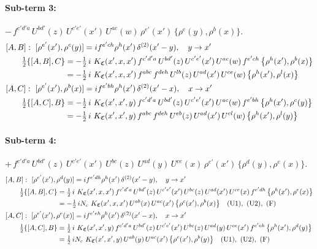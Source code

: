 \documentclass[10pt]{article}
\numberwithin{equation}{section}
\begin{document}
\paragraph{Sub-term 3:} $-\,f^{c'd'a}\,U^{bd'}(z)\,U^{c'e'}(x')\,U^{ac}(w)\,\rho^{e'}(x')\,\big\{\rho^{c}(y),\rho^{b}(x)\big\}$.
\begin{align}
&[A,B]:\ [\rho^{e'}(x'),\rho^{c}(y)]=i f^{e'ch}\rho^{h}(x')\,\delta^{(2)}(x'-y),\quad y\to x'\notag\\
&\qquad \tfrac12\{[A,B],C\}=-\tfrac12\,i\,\,K_{\mathfrak C}(x',x,x')\,f^{c'd'a}\,U^{bd'}(z)\,U^{c'e'}(x')\,U^{ac}(w)\,f^{e'ch}\,\big\{\rho^{h}(x'),\rho^{b}(x)\big\}\notag\\
&\qquad\phantom{\tfrac12\{[A,B],C\}}=-\tfrac12\,i\,\,K_{\mathfrak C}(x',x,x')\,f^{abc}\,f^{deh}\,U^{lb}(z)\,U^{ad}(x')\,U^{ce}(w)\,\big\{\rho^{h}(x'),\rho^{l}(x)\big\}
\label{eq:GIII.III-3-AB}\\
&[A,C]:\ [\rho^{e'}(x'),\rho^{b}(x)]=i f^{e'bh}\rho^{h}(x')\,\delta^{(2)}(x'-x),\quad x\to x'\notag\\
&\qquad \tfrac12\{[A,C],B\}=-\tfrac12\,i\,\,K_{\mathfrak C}(x',x',y)\,f^{c'd'a}\,U^{bd'}(z)\,U^{c'e'}(x')\,U^{ac}(w)\,f^{e'bh}\,\big\{\rho^{h}(x'),\rho^{c}(y)\big\}\notag\\
&\qquad\phantom{\tfrac12\{[A,C],B\}}=-\tfrac12\,i\,\,K_{\mathfrak C}(x',x',y)\,f^{abc}\,f^{deh}\,U^{eb}(z)\,U^{ad}(x')\,U^{cl}(w)\,\big\{\rho^{h}(x'),\rho^{l}(y)\big\}
\label{eq:GIII.III-3-AC}
\end{align}
\paragraph{Sub-term 4:} $+\,f^{c'd'a}\,U^{bd'}(z)\,U^{c'e'}(x')\,U^{bc}(z)\,U^{ad}(y)\,U^{ce}(x)\,\rho^{e'}(x')\,\big\{\rho^{d}(y),\rho^{e}(x)\big\}$.
\begin{align}
&[A,B]:\ [\rho^{e'}(x'),\rho^{d}(y)]=i f^{e'dh}\rho^{h}(x')\,\delta^{(2)}(x'-y),\quad y\to x'\notag\\
&\qquad \tfrac12\{[A,B],C\}=\tfrac12\,i\,\,K_{\mathfrak C}(x',x,x')\,f^{c'd'a}\,U^{bd'}(z)\,U^{c'e'}(x')\,U^{bc}(z)\,U^{ad}(x')\,U^{ce}(x)\,f^{e'dh}\,\big\{\rho^{h}(x'),\rho^{e}(x)\big\}\notag\\
&\qquad\phantom{\tfrac12\{[A,B],C\}}=-\tfrac12\,i N_{c}\,\,K_{\mathfrak C}(x',x,x')\,U^{ab}(x)\,U^{ac}(x')\,\big\{\rho^{c}(x'),\rho^{b}(x)\big\}\quad\text{(U1)},\ \text{(U2)},\ \text{(F)}
\label{eq:GIII.III-4-AB}\\
&[A,C]:\ [\rho^{e'}(x'),\rho^{e}(x)]=i f^{e'eh}\rho^{h}(x')\,\delta^{(2)}(x'-x),\quad x\to x'\notag\\
&\qquad \tfrac12\{[A,C],B\}=\tfrac12\,i\,\,K_{\mathfrak C}(x',x',y)\,f^{c'd'a}\,U^{bd'}(z)\,U^{c'e'}(x')\,U^{bc}(z)\,U^{ad}(y)\,U^{ce}(x')\,f^{e'eh}\,\big\{\rho^{h}(x'),\rho^{d}(y)\big\}\notag\\
&\qquad\phantom{\tfrac12\{[A,C],B\}}=\tfrac12\,i N_{c}\,\,K_{\mathfrak C}(x',x',y)\,U^{ab}(y)\,U^{ac}(x')\,\big\{\rho^{c}(x'),\rho^{b}(y)\big\}\quad\text{(U1)},\ \text{(U2)},\ \text{(F)}
\label{eq:GIII.III-4-AC}
\end{align}
\end{document}

